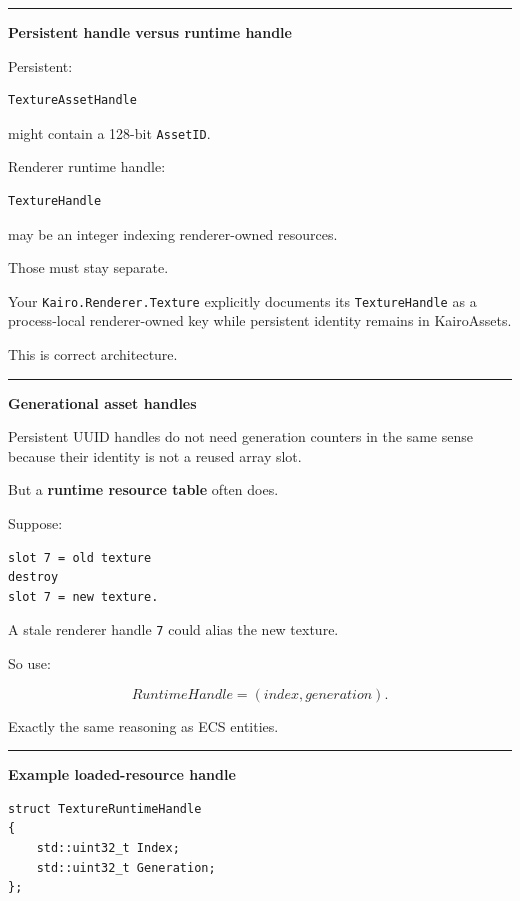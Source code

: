 \begin{center}\rule{0.5\linewidth}{0.5pt}\end{center}

\textbf{Persistent handle versus runtime handle}

Persistent:

\begin{verbatim}
TextureAssetHandle
\end{verbatim}

might contain a 128-bit \texttt{AssetID}.

Renderer runtime handle:

\begin{verbatim}
TextureHandle
\end{verbatim}

may be an integer indexing renderer-owned resources.

Those must stay separate.

Your \texttt{Kairo.Renderer.Texture} explicitly documents its \texttt{TextureHandle} as a process-local renderer-owned key while persistent identity remains in KairoAssets.

This is correct architecture.

\begin{center}\rule{0.5\linewidth}{0.5pt}\end{center}

\textbf{Generational asset handles}

Persistent UUID handles do not need generation counters in the same sense because their identity is not a reused array slot.

But a \textbf{runtime resource table} often does.

Suppose:

\begin{verbatim}
slot 7 = old texture
destroy
slot 7 = new texture.
\end{verbatim}

A stale renderer handle \texttt{7} could alias the new texture.

So use:

\[
RuntimeHandle=(index,generation).
\]

Exactly the same reasoning as ECS entities.

\begin{center}\rule{0.5\linewidth}{0.5pt}\end{center}

\textbf{Example loaded-resource handle}

\begin{verbatim}
struct TextureRuntimeHandle
{
    std::uint32_t Index;
    std::uint32_t Generation;
};
\end{verbatim}

